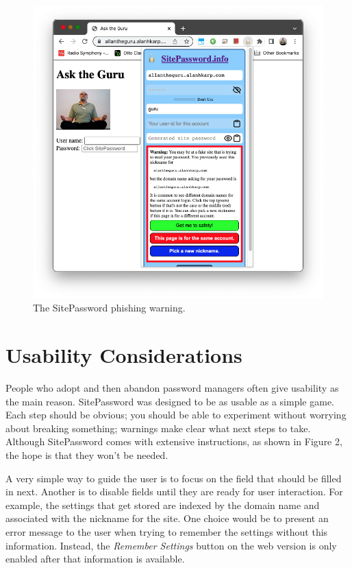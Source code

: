 \begin{figure}
\begin{center}
  \includegraphics[scale=0.30]{soupsfig3.png}
\end{center}
\caption{\label{fig:phishing} The SitePassword phishing warning. }
\end{figure}

\section{Usability Considerations}\label{sec:usability}

People who adopt and then abandon password managers often give usability as the main reason.  SitePassword was designed to be as usable as a simple game.  Each step should be obvious; you should be able to experiment without worrying about breaking something; warnings make clear what next steps to take.  Although SitePassword comes with extensive instructions, as shown in Figure 2, the hope is that they won't be needed.

A very simple way to guide the user is to focus on the field that should be filled in next. Another is to disable fields until they are ready for user interaction.  For example, the settings that get stored are indexed by the domain name and associated with the nickname for the site. One choice would be to present an error message to the user when trying to remember the settings without this information.  Instead, the {\em Remember Settings} button on the web version is only enabled after that information is available.

